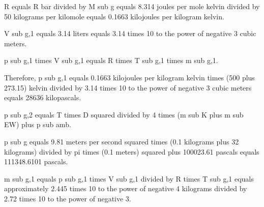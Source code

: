 R equals R bar divided by M sub g equals 8.314 joules per mole kelvin divided by 50 kilograms per kilomole equals 0.1663 kilojoules per kilogram kelvin.  

V sub g,1 equals 3.14 liters equals 3.14 times 10 to the power of negative 3 cubic meters.  

p sub g,1 times V sub g,1 equals R times T sub g,1 times m sub g,1.  

Therefore, p sub g,1 equals 0.1663 kilojoules per kilogram kelvin times (500 plus 273.15) kelvin divided by 3.14 times 10 to the power of negative 3 cubic meters equals 28636 kilopascals.  

p sub g,2 equals T times D squared divided by 4 times (m sub K plus m sub EW) plus p sub amb.  

p sub g equals 9.81 meters per second squared times (0.1 kilograms plus 32 kilograms) divided by pi times (0.1 meters) squared plus 100023.61 pascals equals 111348.6101 pascals.  

m sub g,1 equals p sub g,1 times V sub g,1 divided by R times T sub g,1 equals approximately 2.445 times 10 to the power of negative 4 kilograms divided by 2.72 times 10 to the power of negative 3.